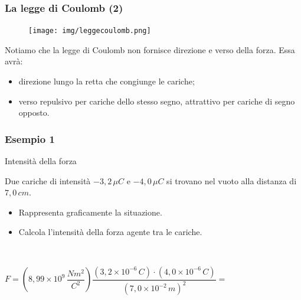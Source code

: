 \documentclass[]{beamer}
\theoremstyle{plain}
\begin{document}
\begin{frame}
\frametitle{La legge di Coulomb (2)}
\begin{figure}
\texttt{[image: img/leggecoulomb.png]}
\end{figure}
Notiamo che la legge di Coulomb non fornisce direzione e verso della forza.{\pause} Essa avrà:
\begin{itemize}
  \item direzione lungo la retta che congiunge le cariche;\pause
  \item verso repulsivo per cariche dello stesso segno, attrattivo per cariche di segno opposto.
\end{itemize}
\end{frame}




\begin{frame}
\frametitle{Esempio 1}
\begin{exampleblock}{Intensità della forza}
{\small Due cariche di intensità $ - 3,2 \, \mu C $ e $ - 4,0 \, \mu C $ si trovano nel vuoto alla distanza di $ 7,0 \, cm $.
\begin{itemize}
  \item Rappresenta graficamente la situazione.
  \item Calcola l'intensità della forza agente tra le cariche.
\end{itemize}}
\end{exampleblock}\pause

~


\begin{center}
$ F =  \left( 8,99 \times 10^9 \, \dfrac{Nm^2}{C^2} \right) \dfrac{\left( 3,2 \times 10^{-6} \, C \right)\cdot\left( 4,0 \times 10^{-6} \, C \right)}{\left( 7,0 \times 10^{-2} \, m \right)^2} = $\pause

~

~

\end{center}
\end{frame}
\end{document}
